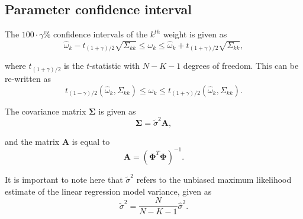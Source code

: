 \documentclass{article}
\begin{document}
\subsection{Parameter confidence interval}

The $100 \cdot \gamma\%$ confidence intervals of the $k^{th}$ weight is given as
\begin{equation}
\hat{\omega}_k - t_{(1+\gamma)/2} \sqrt{\Sigma_{kk}} \leq \omega_k \leq \hat{\omega}_k + t_{(1+\gamma)/2} \sqrt{\Sigma_{kk}},
\end{equation}

where $t_{(1+\gamma)/2}$ is the $t$-statistic with $N - K - 1$ degrees of freedom. This can be re-written as
\begin{equation}
t_{(1-\gamma)/2}\left(\hat{\omega}_k, \Sigma_{kk}\right) \leq \omega_k \leq t_{(1+\gamma)/2}\left(\hat{\omega}_k, \Sigma_{kk}\right).
\end{equation}

The covariance matrix $\boldsymbol\Sigma$ is given as
\begin{equation}
\boldsymbol\Sigma = \tilde{\sigma}^2 \mathbf{A},
\end{equation}

and the matrix $\mathbf{A}$ is equal to
\begin{equation}
\mathbf{A} = \left( \boldsymbol\Phi^T\boldsymbol\Phi \right)^{-1}.
\end{equation}

It is important to note here that $\tilde{\sigma}^2$ refers to the unbiased maximum likelihood estimate of the linear regression model variance, given as 
\begin{equation}
\tilde{\sigma}^2 = \frac{N}{N - K - 1}\hat{\sigma}^2.
\end{equation}
\end{document}
